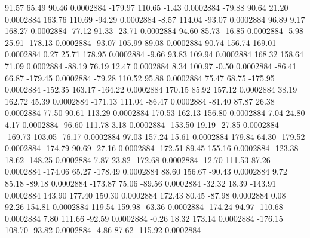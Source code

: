        91.57       65.49       90.46     0.0002884
     -179.97      110.65       -1.43     0.0002884
      -79.88       90.64       21.20     0.0002884
      163.76      110.69      -94.29     0.0002884
       -8.57      114.04      -93.07     0.0002884
       96.89        9.17      168.27     0.0002884
      -77.12       91.33      -23.71     0.0002884
       94.60       85.73      -16.85     0.0002884
       -5.98       25.91     -178.13     0.0002884
      -93.07      105.99       89.08     0.0002884
       90.74      156.74      169.01     0.0002884
        0.27       25.71      178.95     0.0002884
       -9.66       93.83      109.94     0.0002884
      168.32      158.64       71.09     0.0002884
      -88.19       76.19       12.47     0.0002884
        8.34      100.97       -0.50     0.0002884
      -86.41       66.87     -179.45     0.0002884
      -79.28      110.52       95.88     0.0002884
       75.47       68.75     -175.95     0.0002884
     -152.35      163.17     -164.22     0.0002884
      170.15       85.92      157.12     0.0002884
       38.19      162.72       45.39     0.0002884
     -171.13      111.04      -86.47     0.0002884
      -81.40       87.87       26.38     0.0002884
       77.50       90.61      113.29     0.0002884
      170.53      162.13      156.80     0.0002884
        7.04       24.80        4.17     0.0002884
      -96.60      111.78        3.18     0.0002884
     -153.50       19.19      -27.85     0.0002884
     -169.73      103.05      -76.17     0.0002884
       97.03      157.24       15.61     0.0002884
      179.84       64.30     -179.52     0.0002884
     -174.79       90.69      -27.16     0.0002884
     -172.51       89.45      155.16     0.0002884
     -123.38       18.62     -148.25     0.0002884
        7.87       23.82     -172.68     0.0002884
      -12.70      111.53       87.26     0.0002884
     -174.06       65.27     -178.49     0.0002884
       88.60      156.67      -90.43     0.0002884
        9.72       85.18      -89.18     0.0002884
     -173.87       75.06      -89.56     0.0002884
      -32.32       18.39     -143.91     0.0002884
      143.90      177.40      150.30     0.0002884
      172.43       80.45      -87.98     0.0002884
        0.08       92.26      154.81     0.0002884
      119.54      159.98      -63.36     0.0002884
     -174.24       94.97     -110.68     0.0002884
        7.80      111.66      -92.59     0.0002884
       -0.26       18.32      173.14     0.0002884
     -176.15      108.70      -93.82     0.0002884
       -4.86       87.62     -115.92     0.0002884
